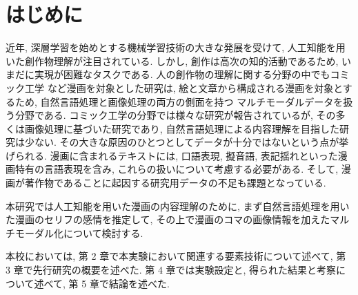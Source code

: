 \newpage
\changeindent{0cm}
\section{はじめに}
\changeindent{2cm}
近年, 深層学習を始めとする機械学習技術の大きな発展を受けて, 人工知能を用いた創作物理解が注目されている.
しかし, 創作は高次の知的活動であるため, いまだに実現が困難なタスクである.
人の創作物の理解に関する分野の中でもコミック工学 \cite{comic} など漫画を対象とした研究は,
絵と文章から構成される漫画を対象とするため, 自然言語処理と画像処理の両方の側面を持つ
マルチモーダルデータを扱う分野である.
コミック工学の分野では様々な研究が報告されているが,
その多くは画像処理に基づいた研究であり,
自然言語処理による内容理解を目指した研究は少ない.
その大きな原因のひとつとしてデータが十分ではないという点が挙げられる.
漫画に含まれるテキストには, 口語表現, 擬音語, 表記揺れといった漫画特有の言語表現を含み,
これらの扱いについて考慮する必要がある.
そして, 漫画が著作物であることに起因する研究用データの不足も課題となっている.

本研究では人工知能を用いた漫画の内容理解のために,
まず自然言語処理を用いた漫画のセリフの感情を推定して,
その上で漫画のコマの画像情報を加えたマルチモーダル化について検討する.

本校においては, 第 2 章で本実験において関連する要素技術について述べて,
第 3 章で先行研究の概要を述べた. 第 4 章では実験設定と, 得られた結果と考察について述べて,
第 5 章で結論を述べた.
